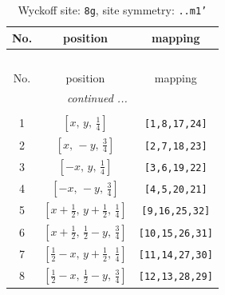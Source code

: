 \documentclass[fleqn,8pt]{jsarticle}
\begin{document}
\begin{longtable}{ccc}
\caption{Wyckoff site: {\tt 8g}, site symmetry: {\tt ..m1'}}
 \\
 \hline \hline
No. & position & mapping \\ \hline \endfirsthead

\multicolumn{2}{l}{\tablename\ \thetable{}} \\
 \hline \hline
No. & position & mapping \\ \hline \endhead

 \hline \hline
\multicolumn{2}{r}{\footnotesize\it continued ...} \\ \endfoot

 \hline \hline
\multicolumn{2}{r}{} \\ \endlastfoot

1 & $\left[ x,\, y,\, \frac{1}{4} \right]$ & {\tt [1,8,17,24]} \\ \hline
2 & $\left[ x,\, - y,\, \frac{3}{4} \right]$ & {\tt [2,7,18,23]} \\ \hline
3 & $\left[ - x,\, y,\, \frac{1}{4} \right]$ & {\tt [3,6,19,22]} \\ \hline
4 & $\left[ - x,\, - y,\, \frac{3}{4} \right]$ & {\tt [4,5,20,21]} \\ \hline
5 & $\left[ x + \frac{1}{2},\, y + \frac{1}{2},\, \frac{1}{4} \right]$ & {\tt [9,16,25,32]} \\ \hline
6 & $\left[ x + \frac{1}{2},\, \frac{1}{2} - y,\, \frac{3}{4} \right]$ & {\tt [10,15,26,31]} \\ \hline
7 & $\left[ \frac{1}{2} - x,\, y + \frac{1}{2},\, \frac{1}{4} \right]$ & {\tt [11,14,27,30]} \\ \hline
8 & $\left[ \frac{1}{2} - x,\, \frac{1}{2} - y,\, \frac{3}{4} \right]$ & {\tt [12,13,28,29]} \\
\end{longtable}
\renewcommand{\arraystretch}{1.2}
\end{document}
